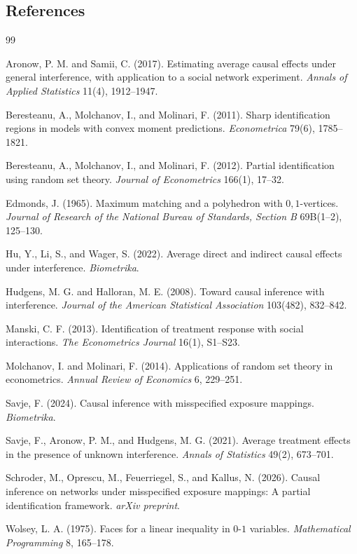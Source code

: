 \documentclass[11pt]{article}
\theoremstyle{definition}
\theoremstyle{plain}
\theoremstyle{remark}
\begin{document}
\subsection*{References}
\begin{thebibliography}{99}

Aronow, P. M. and Samii, C. (2017).
Estimating average causal effects under general interference, with application to a social network experiment.
\emph{Annals of Applied Statistics} 11(4), 1912--1947.

Beresteanu, A., Molchanov, I., and Molinari, F. (2011).
Sharp identification regions in models with convex moment predictions.
\emph{Econometrica} 79(6), 1785--1821.

Beresteanu, A., Molchanov, I., and Molinari, F. (2012).
Partial identification using random set theory.
\emph{Journal of Econometrics} 166(1), 17--32.

Edmonds, J. (1965).
Maximum matching and a polyhedron with \(0,1\)-vertices.
\emph{Journal of Research of the National Bureau of Standards, Section B} 69B(1--2), 125--130.

Hu, Y., Li, S., and Wager, S. (2022).
Average direct and indirect causal effects under interference.
\emph{Biometrika}.

Hudgens, M. G. and Halloran, M. E. (2008).
Toward causal inference with interference.
\emph{Journal of the American Statistical Association} 103(482), 832--842.

Manski, C. F. (2013).
Identification of treatment response with social interactions.
\emph{The Econometrics Journal} 16(1), S1--S23.

Molchanov, I. and Molinari, F. (2014).
Applications of random set theory in econometrics.
\emph{Annual Review of Economics} 6, 229--251.

Savje, F. (2024).
Causal inference with misspecified exposure mappings.
\emph{Biometrika}.

Savje, F., Aronow, P. M., and Hudgens, M. G. (2021).
Average treatment effects in the presence of unknown interference.
\emph{Annals of Statistics} 49(2), 673--701.

Schroder, M., Oprescu, M., Feuerriegel, S., and Kallus, N. (2026).
Causal inference on networks under misspecified exposure mappings: A partial identification framework.
\emph{arXiv preprint}.

Wolsey, L. A. (1975).
Faces for a linear inequality in \(0\)-\(1\) variables.
\emph{Mathematical Programming} 8, 165--178.

\end{thebibliography}
\end{document}
